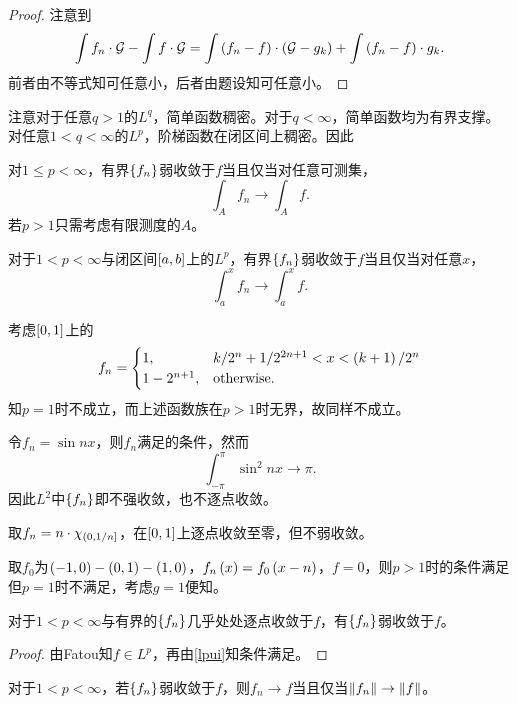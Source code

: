 \documentclass{ctexrep}
\begin{document}
  \begin{proof}
  注意到
  \[ \int f_n\cdot \mathcal{G} - \int f\cdot\mathcal{G} = \int \left(f_n-f\right)\cdot\left(\mathcal{G}-g_k\right) + \int \left(f_n-f\right)\cdot g_k. \]
  前者由\hd 不等式知可任意小，后者由题设知可任意小。
  \end{proof}
  注意对于任意$q>1$的$L^q$，简单函数稠密。对于$q<\infty$，简单函数均为有界支撑。对任意$1<q<\infty$的$L^p$，阶梯函数在闭区间上稠密。因此
  \begin{theorem}
  \label{thm:wa}
  对$1\le p<\infty$，有界$\left\{f_n\right\}$弱收敛于$f$当且仅当对任意可测集，
  \[ \int_A f_n \rightarrow \int_A f. \]
  若$p>1$只需考虑有限测度的$A$。
  \end{theorem}
  \begin{theorem}
  \label{thm:wax}
  对于$1<p<\infty$与闭区间$\left[a,b\right]$上的$L^p$，有界$\left\{f_n\right\}$弱收敛于$f$当且仅当对任意$x$，
  \[ \int_a^x f_n \rightarrow \int_a^x f. \]
  \end{theorem}
  考虑$\left[0,1\right]$上的
  \begin{align*}
    f_n = 
    \begin{cases}
    1,& k/2^n+1/2^{2n+1}<x<\left(k+1\right)/2^n \\
    1-{2^{n+1},}& \text{otherwise.}
    \end{cases}
  \end{align*}
  知$p=1$时不成立，而上述函数族在$p>1$时无界，故同样不成立。
  \begin{ex}
  令$f_n=\sin nx$，则$f_n$满足的条件，然而
  \[ \int_{-\pi}^{\pi}\sin^2 nx\rightarrow \pi. \]
  因此$L^2$中$\left\{f_n\right\}$即不强收敛，也不逐点收敛。
  \end{ex}
  \begin{ex}
  取$f_n=n\cdot\chi_{\left(0,1/n\right]}$，在$\left[0,1\right]$上逐点收敛至零，但不弱收敛。
  \end{ex}
  \begin{ex}
  取$f_0$为$\left(-1,0\right)-\left(0,1\right)-\left(1,0\right)$，$f_n\left(x\right) = f_0\left(x-n\right)$，$f=0$，则$p>1$时的条件满足但$p=1$时不满足，考虑$g=1$便知。
  \end{ex}
  \begin{theorem}
  对于$1<p<\infty$与有界的$\left\{f_n\right\}$几乎处处逐点收敛于$f$，有$\left\{f_n\right\}$弱收敛于$f$。
  \end{theorem}
  \begin{proof}
  由Fatou知$f\in L^p$，再由\cref{lpui}知条件满足。
  \end{proof}
  \begin{theorem}
  对于$1<p<\infty$，若$\left\{f_n\right\}$弱收敛于$f$，则$f_n\rightarrow f$当且仅当$\norm{f_n}\rightarrow\norm{f}$。
  \end{theorem}
\end{document}
